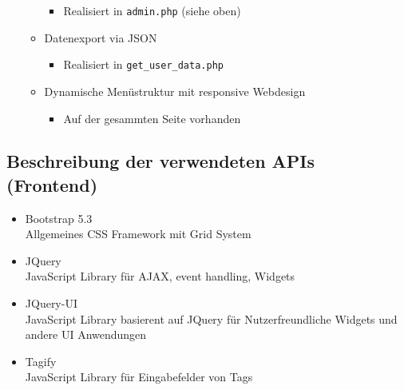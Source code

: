 \documentclass{article}
\begin{document}
\begin{itemize}
\begin{itemize}
\begin{itemize}
                \item Realisiert in \verb|admin.php| (siehe oben)
            \end{itemize}
        \item Datenexport via JSON
            \begin{itemize}
                \item Realisiert in \verb|get_user_data.php|
            \end{itemize}
        \item Dynamische Menüstruktur mit responsive Webdesign
            \begin{itemize}
                \item Auf der gesammten Seite vorhanden
            \end{itemize}
    \end{itemize}
\end{itemize}

\subsection{Beschreibung der verwendeten APIs (Frontend)}
\begin{itemize}
    \item Bootstrap 5.3\\
        Allgemeines CSS Framework mit Grid System
    \item JQuery\\
        JavaScript Library für AJAX, event handling, Widgets
    \item JQuery-UI\\
        JavaScript Library basierent auf JQuery für Nutzerfreundliche Widgets und andere
        UI Anwendungen
    \item Tagify\\
        JavaScript Library für Eingabefelder von Tags
\end{itemize}
\label{tab:my_label}

\pagebreak
\end{document}
